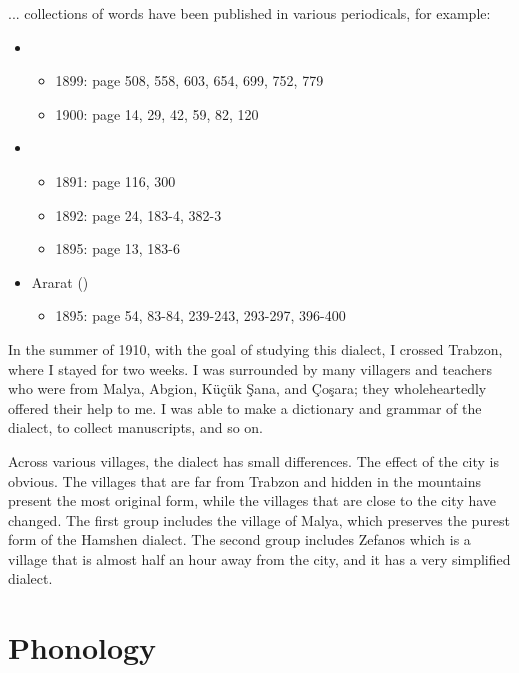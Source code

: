 \begin{adjarianpage}\label{page:185}\end{adjarianpage}%

... collections of words have been published in various periodicals, for example:

\begin{itemize}
	\item {}
	\begin{itemize}
		\item 1899: page 508, 558, 603, 654, 699, 752, 779
		\item1900: page 14, 29, 42, 59, 82, 120
	\end{itemize}
	\item {}
	\begin{itemize}
		\item 1891: page 116, 300
		\item 1892: page 24, 183-4, 382-3
		\item 1895: page 13, 183-6
		
	\end{itemize}
	\item Ararat ()
	\begin{itemize}
		\item 1895: page 54, 83-84, 239-243, 293-297, 396-400
	\end{itemize}
\end{itemize}

In the summer of 1910, with the goal of studying this dialect, I crossed Trabzon, where I stayed for two weeks. I was surrounded by many villagers and teachers who were from Malya, Abgion, Küçük Şana, and Çoşara; they wholeheartedly offered their help to me. I was able to make a dictionary and grammar of the dialect, to collect manuscripts, and so on. 

Across various villages, the dialect has small differences. The effect of the city is obvious. The villages that are far from Trabzon and hidden in the mountains present the most original form, while the villages that are close to the city have changed. The first group includes the village of Malya, which preserves the purest form of the Hamshen dialect. The second group includes Zefanos which is a village that is almost half an hour away from the city, and it has a very simplified dialect. 

\section{Phonology}

